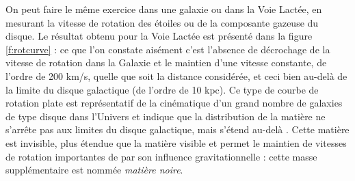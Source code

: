 On peut faire le même exercice dans une galaxie ou dans la Voie Lactée, en mesurant la vitesse de rotation des étoiles ou de la composante gazeuse du disque. Le résultat obtenu pour la Voie Lactée est présenté dans la figure \ref{f:rotcurve} : ce que l'on constate aisément c'est l'absence de décrochage de la vitesse de rotation dans la Galaxie et le maintien d'une vitesse constante, de l'ordre de 200 km/s, quelle que soit la distance considérée, et ceci bien au-delà de la limite du disque galactique (de l'ordre de 10 kpc). Ce type de courbe de rotation plate est représentatif de la cinématique d'un grand nombre de galaxies de type disque dans l'Univers et indique que la distribution de la matière ne s'arrête pas aux limites du disque galactique, mais s'étend au-delà . Cette matière est invisible, plus étendue que la matière visible et permet le maintien de vitesses de rotation importantes de par son influence gravitationnelle : cette masse supplémentaire est nommée \textit{matière noire}.

